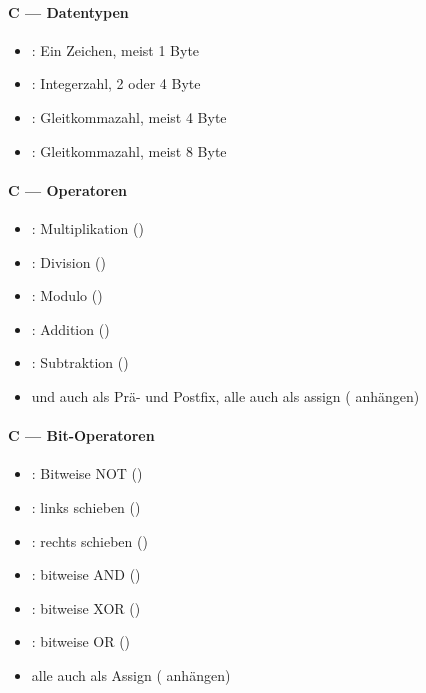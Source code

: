 \paragraph{C --- Datentypen}
\begin{itemize}
  \item \textbf{}: Ein Zeichen, meist 1 Byte
  \item \textbf{}: Integerzahl, 2 oder 4 Byte
  \item \textbf{}: Gleitkommazahl, meist 4 Byte
  \item \textbf{}: Gleitkommazahl, meist 8 Byte
\end{itemize}

\paragraph{C --- Operatoren}
\begin{itemize}
  \item \textbf{\code{*}}: Multiplikation ()
  \item \textbf{\code{/}}: Division ()
  \item \textbf{\code{\%}}: Modulo ()
  \item \textbf{\code{+}}: Addition ()
  \item \textbf{\code{-}}: Subtraktion ()
  \item \code{+} und \code{-} auch als Prä- und Postfix, alle auch als assign (\code{=} anhängen)
\end{itemize}

\paragraph{C --- Bit-Operatoren}
\begin{itemize}
  \item \textbf{\code{\~}}: Bitweise NOT ()
  \item \textbf{\code{<<}}: links schieben ()
  \item \textbf{\code{>>}}: rechts schieben ()
  \item \textbf{\code{&}}: bitweise AND ()
  \item \textbf{\code{^}}: bitweise XOR ()
  \item \textbf{\code{|}}: bitweise OR ()
  \item alle auch als Assign (\code{=} anhängen)
\end{itemize}

